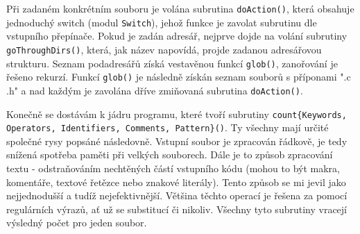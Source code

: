 \documentclass[a4paper, 10pt]{article}[12.03.2013]
\begin{document}
Při zadaném konkrétním souboru je volána subrutina \texttt{doAction()}, která obsahuje
jednoduchý switch (modul \texttt{Switch}), jehož funkce je zavolat subrutinu dle
vstupního přepínače. Pokud je zadán adresář, nejprve dojde na volání subrutiny
\texttt{goThroughDirs()}, která, jak název napovídá, projde zadanou adresářovou
strukturu. Seznam podadresářů získá vestavěnou funkcí \texttt{glob()}, zanořování je řešeno
rekurzí. Funkcí \texttt{glob()} je následně získán seznam souborů s příponami
".c .h" a nad každým je zavolána dříve zmiňovaná subrutina \texttt{doAction()}.

Konečně se dostávám k jádru programu, které tvoří subrutiny
\texttt{count\{Keywords, Operators, Identifiers, Comments, Pattern\}()}. Ty všechny
mají určité společné rysy popsáné následovně. Vstupní soubor je zpracován řádkově,
je tedy snížená spotřeba paměti při velkých souborech. Dále je to způsob zpracování
textu - odstraňováním nechtěných částí vstupního kódu (mohou to být makra, komentáře, 
textové řetězce nebo znakové literály). Tento způsob se mi jevil jako nejjednodušší
a tudíž nejefektivnější. Většina těchto operací je řešena za pomocí
regulárních výrazů, ať už se substitucí či nikoliv. Všechny tyto subrutiny vracejí
výsledný počet pro jeden soubor.
\end{document}
